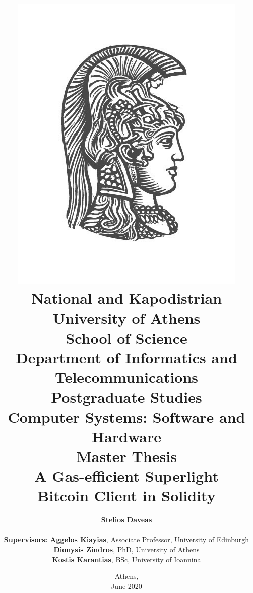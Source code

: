 
\title{
    {\includegraphics[scale=0.8]{figures/logo_uoa.jpg}}\\
    {\large National and Kapodistrian University of Athens \\
    School of Science \\
    Department of Informatics and Telecommunications}\\
    \vspace{1cm}
    Postgraduate Studies \\
    Computer Systems: Software and Hardware\\
    \vspace{10mm}
    {Master Thesis}\\
    \vspace{3mm}
    {\textbf{\LARGE A Gas-efficient Superlight\\Bitcoin Client in Solidity}}\\
    \vspace{1cm}
    }

\author{
    \textbf{Stelios Daveas} \\
    \vspace{1cm} \\
    \textbf{Supervisors: Aggelos Kiayias}, Associate Professor, University of Edinburgh\\
    \hspace{0.30cm}
    \textbf{Dionysis Zindros}, PhD, University of Athens\\
    \hspace{0.45cm}
    \textbf{Kostis Karantias}, BSc, University of Ioannina
    \vspace{2cm}
}

\date{Athens, \\ June 2020}

\maketitle
